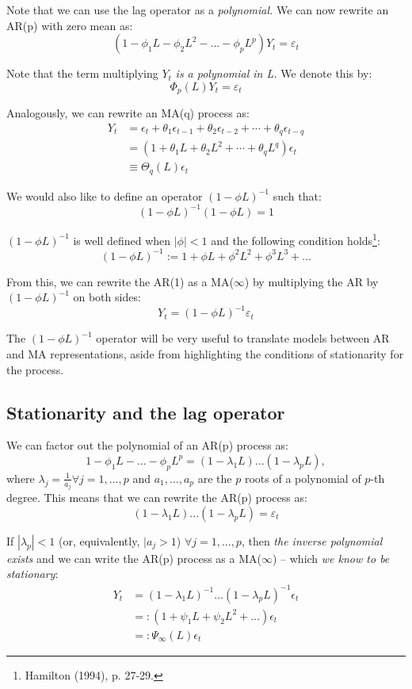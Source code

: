 \documentclass[11pt, a4paper]{report}
\theoremstyle{plain}
\theoremstyle{plain}
\theoremstyle{remark}
\begin{document}
Note that we can use the lag operator as a \textit{polynomial.} We can now rewrite an AR(p) with zero mean as:
$$ (1 - \phi_1 L - \phi_2 L^2 - ... - \phi_p L^p)Y_t = \varepsilon_{t} $$

Note that the term multiplying $Y_t$ \textit{is a polynomial in L.} We denote this by:
$$ \Phi_p (L) Y_t = \varepsilon_{t} $$

Analogously, we can rewrite an MA(q) process as:
$$\begin{aligned}
	Y_{t} &=\epsilon_{t}+\theta_{1} \epsilon_{t-1}+\theta_{2} \epsilon_{t-2}+\cdots+\theta_{q} \epsilon_{t-q} \\
	&=\left(1+\theta_{1} L+\theta_{2} L^{2}+\cdots+\theta_{q} L^{q}\right) \epsilon_{t} \\
	& \equiv \Theta_{q}(L) \epsilon_{t}
\end{aligned}$$

We would also like to define an operator $(1 - \phi L)^{-1}$ such that:
$$ (1 - \phi L)^{-1} (1 - \phi L) = 1 $$

$(1 - \phi L)^{-1}$ is well defined when $|\phi| < 1$ and the following condition holds\footnote{Hamilton (1994), p. 27-29.}:
$$ (1 - \phi L)^{-1} := 1 + \phi L + \phi^2 L^2 + \phi^3 L^3 + ... $$

From this, we can rewrite the AR(1) as a MA($\infty$) by multiplying the AR by $(1 - \phi L)^{-1}$ on both sides:
$$ Y_t = (1 - \phi L)^{-1} \varepsilon_{t}$$

The $(1 - \phi L)^{-1}$ operator will be very useful to translate models between AR and MA representations, aside from highlighting the conditions of stationarity for the process.


\subsection{Stationarity and the lag operator}

We can factor out the polynomial of an AR(p) process as:
$$ 1 - \phi_1 L - ... - \phi_{p} L^p = (1 - \lambda_1 L)...(1 - \lambda_p L), $$
where $\lambda_j = \frac{1}{a_j} \forall j = 1,..., p$ and $a_1, ..., a_p$ are the $p$ roots of a polynomial of $p$-th degree. This means that we can rewrite the AR(p) process as:
$$ (1 - \lambda_1 L)...(1 - \lambda_p L) = \varepsilon_{t} $$

If $|\lambda_p | < 1$ (or, equivalently, $|a_j > 1$) $\forall j = 1, ..., p$, then \textit{the inverse polynomial exists} and we can write the AR(p) process as a MA($\infty$) -- which \textit{we know to be stationary}:
$$\begin{aligned}
	Y_{t} &=\left(1-\lambda_{1} L\right)^{-1} \ldots\left(1-\lambda_{p} L\right)^{-1} \epsilon_{t} \\
	&=:\left(1+\psi_{1} L+\psi_{2} L^{2}+\ldots\right) \epsilon_{t} \\
	&=: \Psi_{\infty}(L) \epsilon_{t}
\end{aligned}$$
\end{document}
